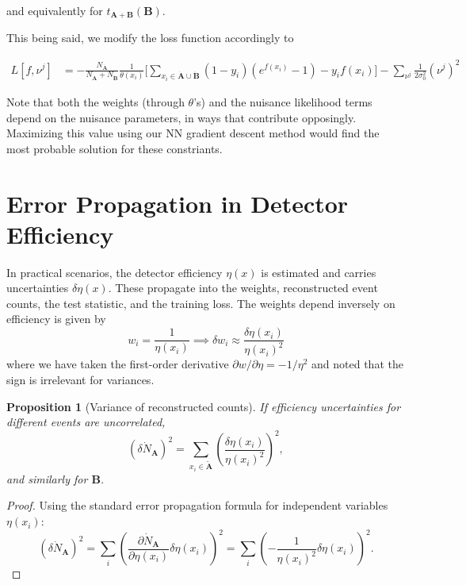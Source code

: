 \documentclass{article}
\newtheorem{proposition}[theorem]{Proposition}
\newcommand{\dataset}[1]{{\mathbf{#1}}}         %
\newcommand{\reco}[1]{{\dataset{\dot{#1}}}}     %
\begin{document}
and equivalently for $t_{\dataset{A}+\dataset{B}}(\dataset{B})$.

This being said, we modify the loss function accordingly to

$$
\begin{aligned} \label{eq:loss_function_with_nuisance}
L[f, \nu^j] &=
    - \frac{N_{\reco{A}}}{N_{\reco{A}} + N_{\reco{B}}} \frac{1}{\theta(x_i)}
    \big[
        \sum_{x_i \in \reco{A} \cup \reco{B}}
        (1-y_i)(e^{f(x_i)} - 1)
        - y_i f(x_i)
    \big]
    - \sum_{\nu^j} \frac{1}{2 \sigma_0^2} (\nu^j)^2
\end{aligned}
$$

Note that both the weights (through $\theta$'s) and the nuisance likelihood terms depend on the nuisance parameters, in ways that contribute opposingly. Maximizing this value using our NN gradient descent method would find the most probable solution for these constriants.


\section{Error Propagation in Detector Efficiency}
In practical scenarios, the detector efficiency \( \eta(x) \) is estimated and carries uncertainties \( \delta \eta(x) \). These propagate into the weights, reconstructed event counts, the test statistic, and the training loss. The weights depend inversely on efficiency is given by
\[
w_i = \frac{1}{\eta(x_i)} \implies \delta w_i \approx \frac{\delta \eta(x_i)}{\eta(x_i)^2}
\]
where we have taken the first-order derivative \(\partial w / \partial \eta = -1/\eta^2\) and noted that the sign is irrelevant for variances.

\begin{proposition}[Variance of reconstructed counts]
    If efficiency uncertainties for different events are uncorrelated,
\[
(\delta \dot{N}_{\mathbf{A}})^2 = \sum_{x_i \in \tilde{\mathbf{A}}} \left( \frac{\delta \eta(x_i)}{\eta(x_i)^2} \right)^2,
\]
and similarly for \( \mathbf{B} \).  
\end{proposition}

\begin{proof}
     Using the standard error propagation formula for independent variables \(\eta(x_i)\):
\[
(\delta \dot{N}_{\mathbf{A}})^2 = \sum_i \left( \frac{\partial \dot{N}_{\mathbf{A}}}{\partial \eta(x_i)} \delta \eta(x_i) \right)^2 = \sum_i \left( -\frac{1}{\eta(x_i)^2} \delta \eta(x_i) \right)^2.
\]
\end{proof}
\end{document}
